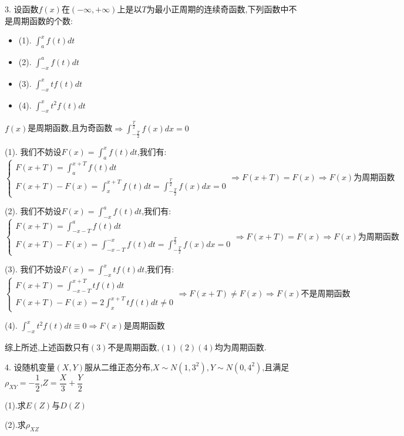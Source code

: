 3. 设函数$f(x)$在$(-\infty,+\infty)$上是以$T$为最小正周期的连续奇函数,下列函数中不是周期函数的个数:  
\begin{itemize}
	\item (1). $\int_{a}^{x}f(t)dt$
	\item (2). $\int_{-x}^{a}f(t)dt$
	\item (3). $\int_{-x}^{x}tf(t)dt$
	\item (4). $\int_{-x}^{x}t^2f(t)dt$
\end{itemize}
\begin{solution}

	$f(x)$是周期函数,且为奇函数$\Rightarrow \int_{-\frac{T}{2}}^{\frac{T}{2}}f(x)dx=0$
	
	(1). 我们不妨设$F(x)=\int_{a}^{x}f(t)dt$,我们有:  
	$$\left\lbrace
	\begin{array}{l}
		F(x+T)=\int_{a}^{x+T}f(t)dt\\
		F(x+T)-F(x)=\int_{x}^{x+T}f(t)dt=\int_{-\frac{T}{2}}^{\frac{T}{2}}f(x)dx=0
	\end{array}
	\right. \Rightarrow F(x+T)=F(x)\Rightarrow F(x)\text{为周期函数}$$
	
	(2). 我们不妨设$F(x)=\int_{-x}^{a}f(t)dt$,我们有:  
	$$\left\lbrace
	\begin{array}{l}
		F(x+T)=\int_{-x-T}^{a}f(t)dt\\
		F(x+T)-F(x)=\int_{-x-T}^{-x}f(t)dt=\int_{-\frac{T}{2}}^{\frac{T}{2}}f(x)dx=0
	\end{array}
	\right. \Rightarrow F(x+T)=F(x)\Rightarrow F(x)\text{为周期函数}$$
	
	(3). 我们不妨设$F(x)=\int_{-x}^{x}tf(t)dt$,我们有:  
	$$\left\lbrace
	\begin{array}{l}
		F(x+T)=\int_{-x-T}^{x+T}tf(t)dt\\
		F(x+T)-F(x)=2\int_{x}^{x+T}tf(t)dt\neq 0
	\end{array}
	\right. \Rightarrow F(x+T)\neq F(x)\Rightarrow F(x)\text{不是周期函数}$$
	
	(4). $\int_{-x}^{x}t^2f(t)dt\equiv 0\Rightarrow F(x)\text{是周期函数}$
	
	综上所述,上述函数只有$(3)$不是周期函数,$(1)(2)(4)$均为周期函数.
\end{solution}

4. 设随机变量$(X,Y)$服从二维正态分布,$X\sim N(1,3^2),Y\sim N(0,4^2)$,且满足$\rho_{XY}=-\dfrac{1}{2}$,$Z=\dfrac{X}{3}+\dfrac{Y}{2}$

(1).求$E(Z)$与$D(Z)$

(2).求$\rho_{XZ}$

